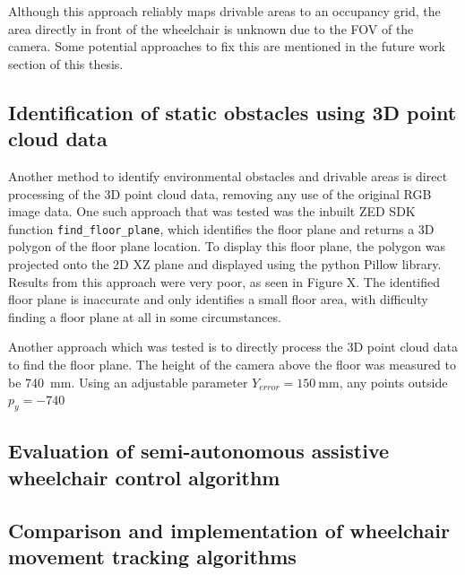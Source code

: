Although this approach reliably maps drivable areas to an occupancy grid,
the area directly in front of the wheelchair is unknown due to the FOV of the camera.
Some potential approaches to fix this are mentioned in the future work section of this thesis.

\subsection{Identification of static obstacles using 3D point cloud data}
Another method to identify environmental obstacles and drivable areas
is direct processing of the 3D point cloud data, removing any use of the original RGB image data.
One such approach that was tested was the inbuilt ZED SDK function \texttt{find_floor_plane},
which identifies the floor plane and returns a 3D polygon of the floor plane location.
To display this floor plane, the polygon was projected onto the 2D XZ plane and displayed
using the python Pillow library. Results from this approach were very poor,
as seen in Figure X. The identified floor plane is inaccurate and only identifies
a small floor area, with difficulty finding a floor plane at all in some circumstances.

Another approach which was tested is to directly process the 3D point cloud data to find the floor plane.
The height of the camera above the floor was measured to be \SI{740}{\milli\metre}.
Using an adjustable parameter $Y_{error} = \SI{150}{\milli\metre}$,
any points outside $p_y = -740$

\subsection{Evaluation of semi-autonomous assistive wheelchair control algorithm}

\subsection{Comparison and implementation of wheelchair movement tracking algorithms}
